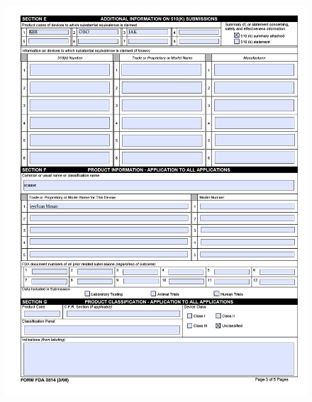 \begin{figure}[H]
  \centering
  \includegraphics[width=1.2\linewidth]{pages/cdrh-pics/3}
  \label{fig:summary}
\end{figure}

